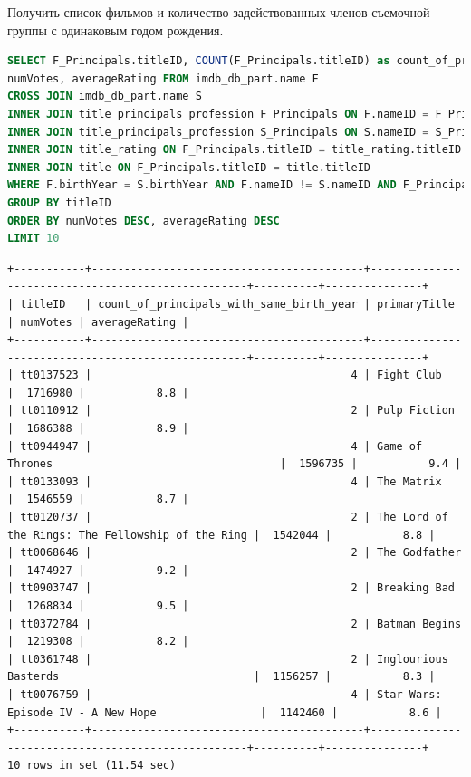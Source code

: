 \documentclass[12pt,a4paper]{article}
\begin{document}
Получить список фильмов и количество задействованных членов съемочной группы с одинаковым годом рождения.

\begin{lstlisting}[language=SQL]
SELECT F_Principals.titleID, COUNT(F_Principals.titleID) as count_of_principals_with_same_birth_year, primaryTitle,
numVotes, averageRating FROM imdb_db_part.name F
CROSS JOIN imdb_db_part.name S
INNER JOIN title_principals_profession F_Principals ON F.nameID = F_Principals.nameID
INNER JOIN title_principals_profession S_Principals ON S.nameID = S_Principals.nameID
INNER JOIN title_rating ON F_Principals.titleID = title_rating.titleID
INNER JOIN title ON F_Principals.titleID = title.titleID
WHERE F.birthYear = S.birthYear AND F.nameID != S.nameID AND F_Principals.titleID = S_Principals.titleID
GROUP BY titleID
ORDER BY numVotes DESC, averageRating DESC
LIMIT 10
\end{lstlisting}

\begin{lstlisting}[basicstyle = \tiny\ttfamily, columns = fixed]
+-----------+------------------------------------------+---------------------------------------------------+----------+---------------+
| titleID   | count_of_principals_with_same_birth_year | primaryTitle                                      | numVotes | averageRating |
+-----------+------------------------------------------+---------------------------------------------------+----------+---------------+
| tt0137523 |                                        4 | Fight Club                                        |  1716980 |           8.8 |
| tt0110912 |                                        2 | Pulp Fiction                                      |  1686388 |           8.9 |
| tt0944947 |                                        4 | Game of Thrones                                   |  1596735 |           9.4 |
| tt0133093 |                                        4 | The Matrix                                        |  1546559 |           8.7 |
| tt0120737 |                                        2 | The Lord of the Rings: The Fellowship of the Ring |  1542044 |           8.8 |
| tt0068646 |                                        2 | The Godfather                                     |  1474927 |           9.2 |
| tt0903747 |                                        2 | Breaking Bad                                      |  1268834 |           9.5 |
| tt0372784 |                                        2 | Batman Begins                                     |  1219308 |           8.2 |
| tt0361748 |                                        2 | Inglourious Basterds                              |  1156257 |           8.3 |
| tt0076759 |                                        4 | Star Wars: Episode IV - A New Hope                |  1142460 |           8.6 |
+-----------+------------------------------------------+---------------------------------------------------+----------+---------------+
10 rows in set (11.54 sec)
\end{lstlisting}
\end{document}
